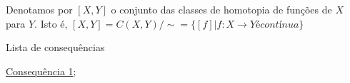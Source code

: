 Denotamos por $[X,Y]$ o conjunto das classes de homotopia de funções de $X$ para $Y$. Isto é, $[X,Y]=C(X,Y)/\sim=\{[f]|f:X\rightarrow Y é contínua\}$ 

\begin{titlemize}{Lista de consequências}
	\item \hyperref[consequencia1]{Consequência 1};\\ %
	\item \hyperref[]{}
\end{titlemize}

